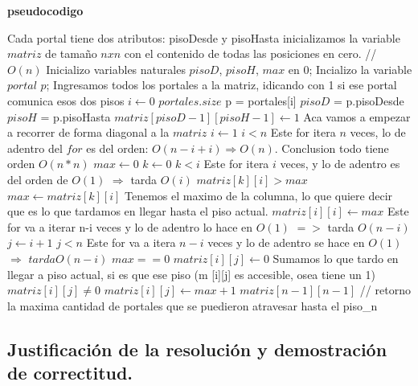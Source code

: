  


\textbf{pseudocodigo} %

\begin{codebox}
	\li \Comment Cada portal tiene dos atributos: pisoDesde y pisoHasta
	\li inicializamos la variable $matriz$ de tamaño $n x n$ con el contenido de todas las posiciones en cero. // $O(n)$
	\li Inicializo variables naturales $pisoD$, $pisoH$, $max$ en 0;
	\li Incializo la variable $portal$ $p$;
	\li \Comment Ingresamos todos los portales a la matriz, idicando con 1 si ese portal comunica esos dos pisos
	\li \For $i \gets 0$ \To $portales.size$ \Do	
	\li 	p = portales[i]
	\li		$pisoD$ = p.pisoDesde
	\li		$pisoH$ = p.pisoHasta
	\li		$matriz[pisoD-1][pisoH-1] \leftarrow  1 $
		\End
	\li \Comment Aca vamos a empezar a recorrer de forma diagonal a la $matriz$ 
	\li \For $i \gets 1 $ \To $ i<n $ \Do 
	\li 	\li \Comment Este for itera $n$ veces, lo de adentro del $for$ es del orden: $O(n-i+i) \Rightarrow O(n)$. Conclusion todo tiene orden $O(n*n)$
	\li		$max \leftarrow 0$
	\li		\For $k \gets 0 $ \To $ k<i $ \Do
	\li			\Comment Este for itera $i$ veces, y lo de adentro es del orden de $O(1)$ $\Rightarrow$ tarda $O(i)$
	\li			\If $ matriz[k][i] > max$
	\li				\Then $max \leftarrow matriz[k][i]$ 
				\End
			\End
	\li		\Comment Tenemos el maximo de la columna, lo que quiere decir que es lo que tardamos en llegar hasta el piso actual.
	\li		$ matriz[i][i] \leftarrow max $		
	\li		\Comment Este for va a iterar n-i veces y lo de adentro lo hace en $O(1)$ $=>$ tarda $O(n-i)$	
	\li		\For $ j \gets i+1 $ \To $ j<n$ \Do  
	\li 		\Comment Este for va a itera $n-i$ veces y lo de adentro se hace en $O(1)$ $\Rightarrow$ $tarda O(n-i)$
	\li 		\If $ max == 0$
	\li 			\Then $ matriz[i][j] \leftarrow 0$
	\li				\Else \Comment Sumamos lo que tardo en llegar a piso actual, si es que ese piso (m [i][j] es accesible, osea tiene un 1)
	\li					\If $matriz[i][j] \neq 0$ 
	\li						\Then $ matriz[i][j] \leftarrow max+1$
						\End
				\End
			\End
		\End 
	\li \Return $matriz[n-1][n-1]$ // retorno la maxima cantidad de portales que se puedieron atravesar hasta el piso_n									      
\end{codebox}

\newpage
\subsection{Justificación de la resolución y demostración de correctitud.}

